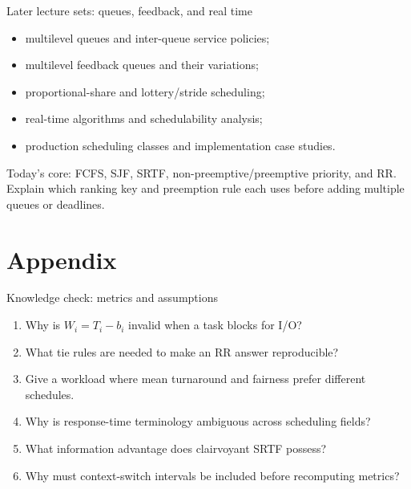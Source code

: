 \documentclass[aspectratio=169,11pt]{beamer}
\begin{document}
\begin{frame}{Later lecture sets: queues, feedback, and real time}
  \begin{itemize}
    \item multilevel queues and inter-queue service policies;
    \item multilevel feedback queues and their variations;
    \item proportional-share and lottery/stride scheduling;
    \item real-time algorithms and schedulability analysis;
    \item production scheduling classes and implementation case studies.
  \end{itemize}
  \begin{tcolorbox}[title=Preparation]
    Today's core: FCFS, SJF, SRTF, non-preemptive/preemptive priority, and RR. Explain which ranking key and preemption rule each uses before adding multiple queues or deadlines.
  \end{tcolorbox}
\end{frame}

\appendix
\section{Appendix}

\begin{frame}{Knowledge check: metrics and assumptions}
  \begin{enumerate}
    \item Why is $W_i=T_i-b_i$ invalid when a task blocks for I/O?
    \item What tie rules are needed to make an RR answer reproducible?
    \item Give a workload where mean turnaround and fairness prefer different schedules.
    \item Why is response-time terminology ambiguous across scheduling fields?
    \item What information advantage does clairvoyant SRTF possess?
    \item Why must context-switch intervals be included before recomputing metrics?
  \end{enumerate}
\end{frame}
\end{document}
